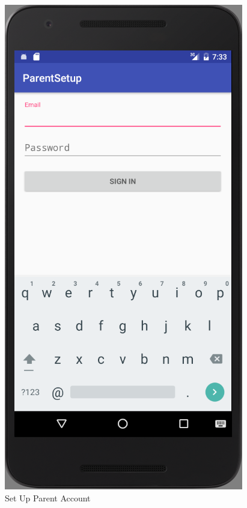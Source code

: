\begin{figure}[ht]
\begin{minipage}[b]{0.45\linewidth}
    \includegraphics[width=.7\linewidth, frame]{../images/Screenshot/ParentSetup.png}
    \caption{Set Up Parent Account} 
    \vspace{4ex}
  \end{minipage}%
\end{figure}